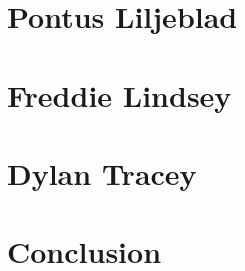 \documentclass[11pt]{article}
\begin{document}
\section{Pontus Liljeblad}



\section{Freddie Lindsey}



\section{Dylan Tracey}



\section{Conclusion}


\end{document}
